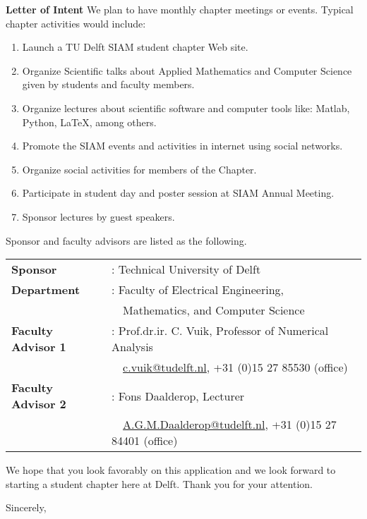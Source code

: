 \documentclass[letterpaper,12pt]{letter}
\begin{document}
\begin{letter}{\textbf{Letter of Intent}}
We plan to have monthly chapter meetings or events. Typical chapter activities would include:
\begin{enumerate}
\item Launch a TU Delft SIAM student chapter Web site.
\item Organize Scientific talks about Applied Mathematics and Computer Science given by students and faculty members.
\item Organize lectures about scientific software and computer tools like: Matlab, Python, \LaTeX, among others. 
\item Promote the SIAM events and activities in internet using social networks.
\item Organize social activities for members of the Chapter.
\item Participate in student day and poster session at SIAM Annual Meeting.
\item Sponsor lectures by guest speakers.
\end{enumerate}
\newpage
Sponsor and faculty advisors are listed as the following.

\begin{tabular}{ll}
\textbf{Sponsor} &: Technical University of Delft \\
\textbf{Department} &: Faculty of Electrical Engineering, \\
&\ \ Mathematics, and Computer Science \\
\textbf{Faculty Advisor 1} &: Prof.dr.ir. C. Vuik, Professor of Numerical Analysis \\
&\ \ \href{c.vuik@tudelft.nl}{c.vuik@tudelft.nl}, +31 (0)15 27 85530 (office) \\
\textbf{Faculty Advisor 2} &: Fons Daalderop, Lecturer \\
&\ \ \href{A.G.M.Daalderop@tudelft.nl}{A.G.M.Daalderop@tudelft.nl}, +31 (0)15 27 84401 (office) \\
\end{tabular}

\bigskip

We hope that you look favorably on this application and we look forward to starting a student chapter here at Delft. Thank you for your attention.

\closing{Sincerely,}


\end{letter}
\end{document}
